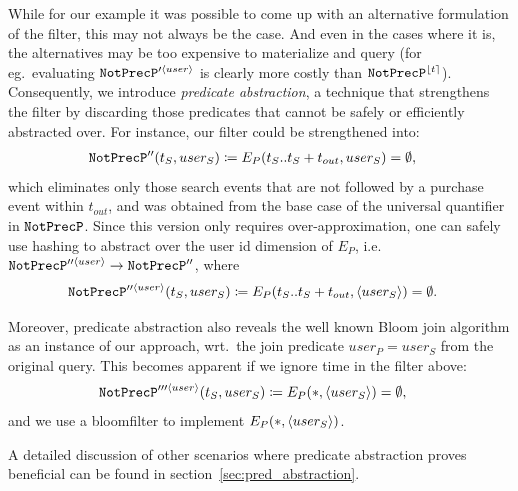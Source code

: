 While for our example it was possible to come up with an alternative formulation
of the filter, this may not always be the case. 
And even in the cases where it is, the alternatives may be too expensive to
materialize and query (for eg.\ evaluating $\texttt{NotPrecP}'^{\langle user \rangle}$ is
clearly more costly than $\texttt{NotPrecP}^{\lfloor t \rceil}$).
Consequently, 
we introduce {\em predicate abstraction}, a technique
that strengthens the filter by discarding those predicates that cannot be safely
or efficiently abstracted over.
For instance, our filter could be strengthened into:
\begin{align*}
&
\texttt{NotPrecP}''(t_S, user_S) \coloneq 
E_P(t_S..t_S + t_{out}, user_S) = \emptyset,
\end{align*} 
which eliminates only those search events that are not followed by a purchase
event within $t_{out}$, and was obtained from the base case of
the universal quantifier in $\texttt{NotPrecP}$.
Since this version only requires over-approximation, one can safely use hashing
to abstract over the user id dimension of $E_P$, i.e.\ 
$\texttt{NotPrecP}''^{\langle user \rangle} \rightarrow \texttt{NotPrecP}''$, where
\begin{align*}
&
\texttt{NotPrecP}''^{\langle user \rangle}(t_S, user_S) \coloneq 
E_P(t_S..t_S + t_{out}, \langle user_S \rangle) = \emptyset .
\end{align*}

Moreover, predicate abstraction also reveals the well known Bloom
join algorithm as an instance of our approach, wrt.\ the join
predicate $user_P = user_S$ from the original query. 
This becomes apparent if we ignore time in the filter above:
\begin{align*}
&
\texttt{NotPrecP}'''^{\langle user \rangle}(t_S, user_S) \coloneq 
E_P(*, \langle user_S \rangle) = \emptyset,
\end{align*}
and we use a bloomfilter to implement $E_P(*, \langle user_S \rangle)$.

A detailed discussion of other scenarios where predicate abstraction proves
beneficial can be found in section~\ref{sec:pred_abstraction}.


